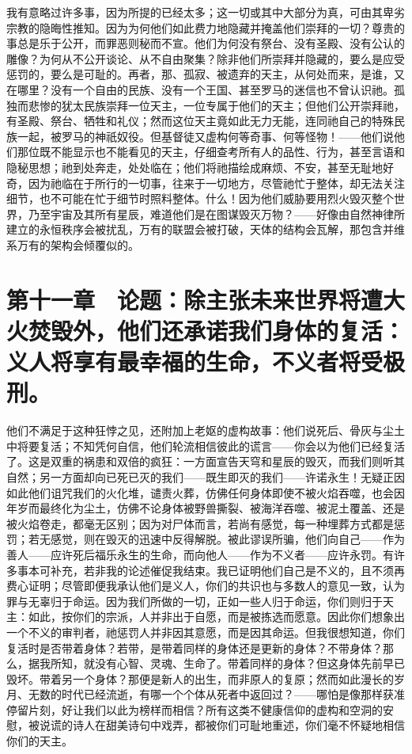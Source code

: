 我有意略过许多事，因为所提的已经太多；这一切或其中大部分为真，可由其卑劣宗教的隐晦性推知。因为为何他们如此费力地隐藏并掩盖他们崇拜的一切？尊贵的事总是乐于公开，而罪恶则秘而不宣。他们为何没有祭台、没有圣殿、没有公认的雕像？为何从不公开谈论、从不自由聚集？除非他们所崇拜并隐藏的，要么是应受惩罚的，要么是可耻的。再者，那、孤寂、被遗弃的天主，从何处而来，是谁，又在哪里？没有一个自由的民族、没有一个王国、甚至罗马的迷信也不曾认识祂。孤独而悲惨的犹太民族崇拜一位天主，一位专属于他们的天主；但他们公开崇拜祂，有圣殿、祭台、牺牲和礼仪；然而这位天主竟如此无力无能，连同祂自己的特殊民族一起，被罗马的神祇奴役。但基督徒又虚构何等奇事、何等怪物！——他们说他们那位既不能显示也不能看见的天主，仔细查考所有人的品性、行为，甚至言语和隐秘思想；祂到处奔走，处处临在；他们将祂描绘成麻烦、不安，甚至无耻地好奇，因为祂临在于所行的一切事，往来于一切地方，尽管祂忙于整体，却无法关注细节，也不可能在忙于细节时照料整体。什么！因为他们威胁要用烈火毁灭整个世界，乃至宇宙及其所有星辰，难道他们是在图谋毁灭万物？——好像由自然神律所建立的永恒秩序会被扰乱，万有的联盟会被打破，天体的结构会瓦解，那包含并维系万有的架构会倾覆似的。\par


\section{第十一章　论题：除主张未来世界将遭大火焚毁外，他们还承诺我们身体的复活：义人将享有最幸福的生命，不义者将受极刑。}

他们不满足于这种狂悖之见，还附加上老妪的虚构故事：他们说死后、骨灰与尘土中将要复活；不知凭何自信，他们轮流相信彼此的谎言——你会以为他们已经复活了。这是双重的祸患和双倍的疯狂：一方面宣告天穹和星辰的毁灭，而我们则听其自然；另一方面却向已死已灭的我们——既生即灭的我们——许诺永生！无疑正因如此他们诅咒我们的火化堆，谴责火葬，仿佛任何身体即使不被火焰吞噬，也会因年岁而最终化为尘土，仿佛不论身体被野兽撕裂、被海洋吞噬、被泥土覆盖、还是被火焰卷走，都毫无区别；因为对尸体而言，若尚有感觉，每一种埋葬方式都是惩罚；若无感觉，则在毁灭的迅速中反得解脱。被此谬误所骗，他们向自己——作为善人——应许死后福乐永生的生命，而向他人——作为不义者——应许永罚。有许多事本可补充，若非我的论述催促我结束。我已证明他们自己是不义的，且不须再费心证明；尽管即便我承认他们是义人，你们的共识也与多数人的意见一致，认为罪与无辜归于命运。因为我们所做的一切，正如一些人归于命运，你们则归于天主：如此，按你们的宗派，人并非出于自愿，而是被拣选而愿意。因此你们想象出一个不义的审判者，祂惩罚人并非因其意愿，而是因其命运。但我很想知道，你们复活时是否带着身体？若带，是带着同样的身体还是更新的身体？不带身体？那么，据我所知，就没有心智、灵魂、生命了。带着同样的身体？但这身体先前早已毁坏。带着另一个身体？那便是新人的出生，而非原人的复原；然而如此漫长的岁月、无数的时代已经流逝，有哪一个个体从死者中返回过？——哪怕是像那样获准停留片刻，好让我们以此为榜样而相信？所有这类不健康信仰的虚构和空洞的安慰，被说谎的诗人在甜美诗句中戏弄，都被你们可耻地重述，你们毫不怀疑地相信你们的天主。\par


